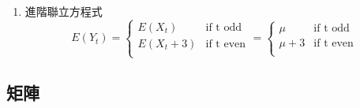 \begin{enumerate}
    \item 進階聯立方程式
    \begin{equation} 
    E(Y_t)=\begin{cases}
 		E(X_t)      &\text{if t odd}\\  
 		E(X_t+3)       &\text{if t even}\\          
 	\end{cases}=\begin{cases}
 	\mu      &\text{if t odd}\\  
 	\mu+3      &\text{if t even}\\  
    \end{cases}
    \end{equation}
    
\end{enumerate}

\subsection{矩陣}

